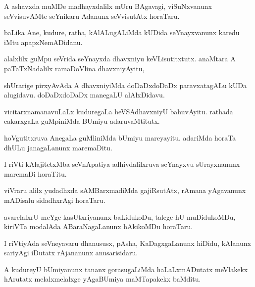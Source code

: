 \documentclass{article}
\begin{document}
\begin{mn}%
A ashavxda muMDe madhayxdalilx mUru BAgavagi, viSuNxvanunx seVvisuvAMte seYnikaru Adanunx 
seVvisutAtx horaTaru.
\end{mn}

\begin{mn}%
baLika Ane, kudure, ratha, kAlALugALiMda kUDida seYnayxvanunx karedu iMtu apapxNemADidanu.
\end{mn}

\begin{mn}%
alalxlilx guMpu seVrida seYnayxda dhavxniyu keVLisutitxtutx. anaMtara A paTaTxNadalilx 
ramaDoVlina dhavxniyAyitu,
\end{mn}

\begin{mn}%
shUrarige pirxyAvAda A dhavxniyiMda doDaDxdoDaDx paravxatagALu kUDa alugidavu. doDaDxdoDaDx
manegaLU alAlxDidavu.
\end{mn}

\begin{mn}%
vicitarxnamanavuLaLx kuduregaLa heVSAdhavxniyU bahuvAyitu. rathada cakarxgaLa guMpiniMda 
BUmiyu adaruvaMtitutx.
\end{mn}

\begin{mn}%
hoVgutitxruva AnegaLa guMliniMda bUmiyu mareyayitu. adariMda horaTa dhULu janagaLanunx 
maremaDitu.
\end{mn}

\begin{mn}%
I riVti kAlajitetxMba seVnApatiya adhivdalilxruva seYnayxvu sUrayxnanunx maremaDi horaTitu.
\end{mn}

\begin{mn}%
viVraru alilx yudadhxda sAMBarxmadiMda gajiRsutAtx, rAmana  yAgavanunx mADisalu 
sidadhxrAgi horaTaru.
\end{mn}

\begin{mn}%
avarelalxrU meYge kasUtxriyanunx baLidukoDu, talege hU muDidukoMDu, kiriVTa modalAda 
ABaraNagaLanunx hAkikoMDu horaTaru.
\end{mn}

\begin{mn}%
I riVtiyAda seVneyavaru dhanususx, pAsha, KaDagxgaLanunx hiDidu, kAlanunx sariyAgi iDutatx 
rAjananunx anusarisidaru. 
\end{mn}

\begin{mn}%
A kudureyU bUmiyanunx tananx gorasugaLiMda haLaLxmADutatx meVlakekx hArutatx 
melalxmelalxge yAgaBUmiya maMTapakekx baMditu.
\end{mn}
\end{document}
